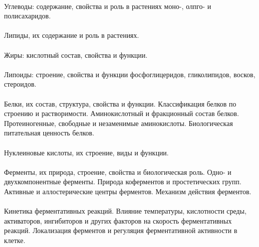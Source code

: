 \paragraph*{}Углеводы: содержание, свойства и роль в растениях моно-, олпго- и полисахаридов.

\paragraph*{}Липиды, их содержание и роль в растениях.

\paragraph*{}Жиры: кислотный состав, свойства и функции.

\paragraph*{}Липоиды: строение, свойства и функции фосфоглицеридов, гликолипидов, восков, стероидов.

\paragraph*{}Белки, их состав, структура, свойства и функции. Классификация белков по строению и растворимости. Аминокислотный и фракционный состав белков. Протеиногенные, свободные и незаменимые аминокислоты. Биологическая питательная ценность белков.

\paragraph*{}Нуклеиновые кислоты, их строение, виды и функции.

\paragraph*{}Ферменты, их природа, строение, свойства и биологическая роль. Одно- и двухкомпонентные ферменты. Природа коферментов и простетических групп. Активные и аллостерические центры ферментов. Механизм действия ферментов.

\paragraph*{}Кинетика ферментативных реакций. Влияние температуры, кислотности среды, активаторов, ингибиторов и других факторов на скорость ферментативных реакций. Локализация ферментов и регуляция ферментативной активности в клетке.

